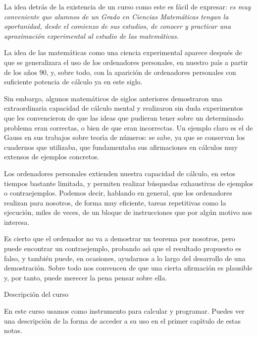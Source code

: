 \label{prologo}
La idea detr\'as de la existencia de un curso como este es f\'acil de expresar:
{\itshape es muy conveniente que alumnos de un Grado en Ciencias Matem\'aticas
tengan la oportunidad, desde
el comienzo de sus estudios, de conocer y practicar una aproximaci\'on
experimental al estudio de las matem\'aticas.}

\smallskip

La idea de las matem\'aticas como una ciencia experimental aparece despu\'es de
que se generalizara el uso de los ordenadores personales, en nuestro pa\'{\i}s a
partir de los a\~nos $90$, y, sobre todo,  con la aparici\'on de ordenadores
personales con suficiente potencia de c\'alculo ya en este siglo. 

\smallskip

Sin embargo, algunos matem\'aticos de siglos anteriores demostraron una
extraordinaria capacidad de c\'alculo mental y realizaron sin duda experimentos
que les convencieron de que las ideas que pudieran tener sobre un determinado
problema eran correctas, o bien de que eran  incorrectas. Un ejemplo claro es el
de Gauss en sus trabajos sobre teor\'{\i}a de n\'umeros: se sabe, ya que se
conservan los cuadernos que utilizaba, que fundamentaba sus afirmaciones en
c\'alculos muy extensos de ejemplos concretos.

\smallskip

Los ordenadores personales extienden nuestra capacidad de c\'alculo, en estos
tiempos bastante limitada, y permiten realizar b\'usquedas exhaustivas de
ejemplos o contraejemplos. Podemos decir, hablando en general, que los
ordenadores realizan para nosotros, de forma muy eficiente,  tareas repetitivas
como la ejecuci\'on, miles de veces,  de un bloque de instrucciones que por
alg\'un motivo nos interesa.  

\smallskip

Es cierto que el ordenador no va a demostrar un teorema por nosotros, pero puede
encontrar un contraejemplo, probando as\'{\i} que el resultado propuesto es
falso, y tambi\'en puede, en ocasiones, ayudarnos a lo largo del desarrollo de
una demostraci\'on. Sobre todo nos convencen de que una cierta afirmaci\'on es
plausible y, por tanto, puede merecer la pena pensar sobre ella.


\bigskip


\pagebreak[3]

{\sc Descripci\'on del curso}

En este curso usamos {\sage} como instrumento para calcular y programar. Puedes
ver una descripci\'on de la forma de acceder a su uso en el primer cap\'{\i}tulo de estas notas. 


